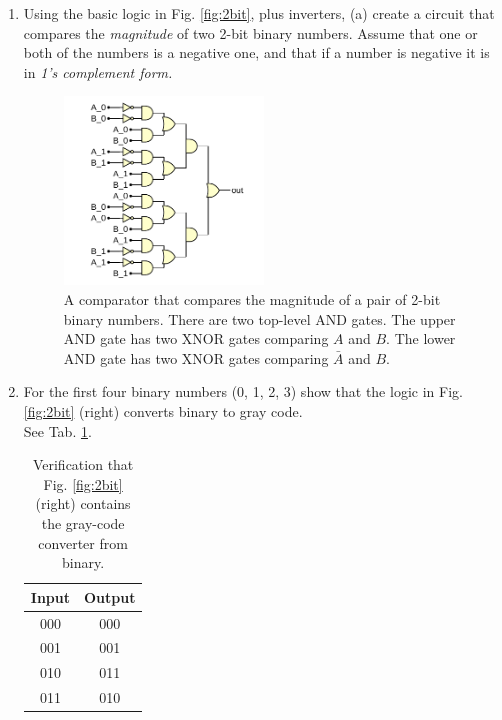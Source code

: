 \documentclass[10pt]{article}
\begin{document}
\begin{enumerate}
\item Using the basic logic in Fig. \ref{fig:2bit}, plus inverters, (a) create a circuit that compares the \textit{magnitude} of two 2-bit binary numbers.  Assume that one or both of the numbers is a negative one, and that if a number is negative it is in \textit{1's complement form.} \\ 
\begin{figure}[ht]
\centering
\includegraphics[width=0.5\textwidth]{figures/gateExample8.pdf}
\caption{\label{fig:comp1} A comparator that compares the magnitude of a pair of 2-bit binary numbers.  There are two top-level AND gates.  The upper AND gate has two XNOR gates comparing $A$ and $B$.  The lower AND gate has two XNOR gates comparing $\bar{A}$ and $B$.}
\end{figure}
\item For the first four binary numbers (0, 1, 2, 3) show that the logic in Fig. \ref{fig:2bit} (right) converts binary to gray code. \\

See Tab. \ref{tab:gray}.

\begin{table}[hb]
\centering
\begin{tabular}{| c | c |}
\hline
Input & Output \\ \hline \hline
000 & 000 \\ \hline
001 & 001 \\ \hline
010 & 011 \\ \hline
011 & 010 \\ \hline
\end{tabular}
\caption{\label{tab:gray} Verification that Fig. \ref{fig:2bit} (right) contains the gray-code converter from binary.}
\end{table}
\end{enumerate}
\end{document}
